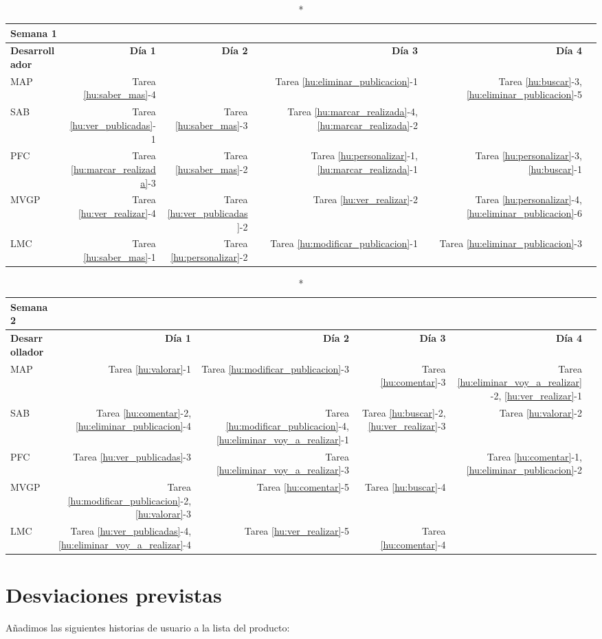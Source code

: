 \documentclass[11pt]{article}
\begin{document}
\begin{longtable}{lrrrrr}
  \caption*{Semana 1}\\
  \toprule
  \textbf{Desarrollador} & \textbf{Día 1} & \textbf{Día 2} & \textbf{Día 3} & \textbf{Día 4} \\
  \midrule
  MAP & Tarea \ref{hu:saber_mas}-4 &  & Tarea \ref{hu:eliminar_publicacion}-1 & Tarea \ref{hu:buscar}-3, \ref{hu:eliminar_publicacion}-5    \\
  SAB & Tarea \ref{hu:ver_publicadas}-1 & Tarea \ref{hu:saber_mas}-3 &  Tarea \ref{hu:marcar_realizada}-4, \ref{hu:marcar_realizada}-2 & \\
  PFC &Tarea \ref{hu:marcar_realizada}-3 & Tarea \ref{hu:saber_mas}-2 & Tarea \ref{hu:personalizar}-1, \ref{hu:marcar_realizada}-1 & Tarea \ref{hu:personalizar}-3, \ref{hu:buscar}-1\\
  MVGP &Tarea \ref{hu:ver_realizar}-4 & Tarea \ref{hu:ver_publicadas}-2  & Tarea \ref{hu:ver_realizar}-2 &Tarea \ref{hu:personalizar}-4, \ref{hu:eliminar_publicacion}-6 \\
  LMC & Tarea \ref{hu:saber_mas}-1 & Tarea \ref{hu:personalizar}-2 &Tarea  \ref{hu:modificar_publicacion}-1 & Tarea \ref{hu:eliminar_publicacion}-3 \\
  \bottomrule
\end{longtable}

\begin{longtable}{lrrrrr}
  \caption*{Semana 2}\\
  \toprule
  \textbf{Desarrollador} & \textbf{Día 1} & \textbf{Día 2} & \textbf{Día 3} & \textbf{Día 4} \\
  \midrule
  MAP & Tarea \ref{hu:valorar}-1 & Tarea \ref{hu:modificar_publicacion}-3 & Tarea \ref{hu:comentar}-3 & Tarea \ref{hu:eliminar_voy_a_realizar}-2, \ref{hu:ver_realizar}-1  \\
  SAB & Tarea \ref{hu:comentar}-2, \ref{hu:eliminar_publicacion}-4  &Tarea \ref{hu:modificar_publicacion}-4, \ref{hu:eliminar_voy_a_realizar}-1  & Tarea \ref{hu:buscar}-2, \ref{hu:ver_realizar}-3  & Tarea \ref{hu:valorar}-2 \\
  PFC &Tarea \ref{hu:ver_publicadas}-3& Tarea \ref{hu:eliminar_voy_a_realizar}-3 && Tarea \ref{hu:comentar}-1,\ref{hu:eliminar_publicacion}-2\\
  MVGP &Tarea \ref{hu:modificar_publicacion}-2, \ref{hu:valorar}-3 &Tarea \ref{hu:comentar}-5 & Tarea \ref{hu:buscar}-4  &  & \\
  LMC & Tarea \ref{hu:ver_publicadas}-4, \ref{hu:eliminar_voy_a_realizar}-4   & Tarea \ref{hu:ver_realizar}-5  & Tarea \ref{hu:comentar}-4&\\
  \bottomrule
\end{longtable}

\section{Desviaciones previstas}

Añadimos las siguientes historias de usuario a la lista del producto:
\end{document}
